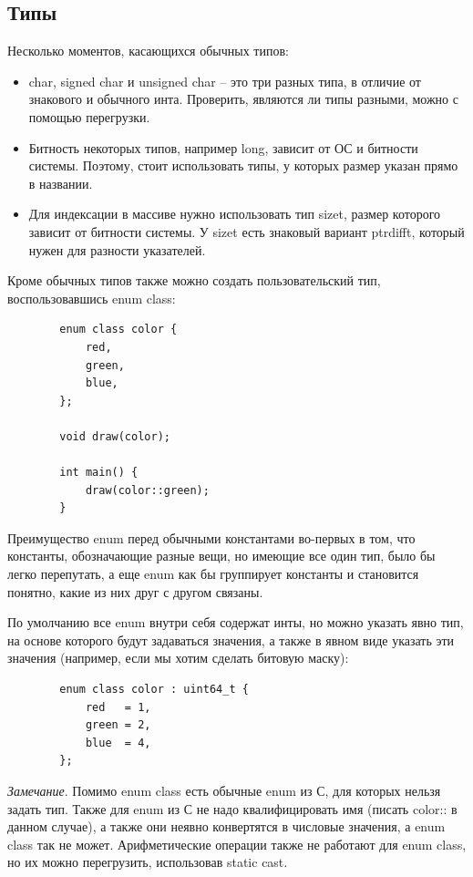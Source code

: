\documentclass[12pt, a4paper]{article}
\begin{document}
	\subsection{Типы}
	Несколько моментов, касающихся обычных типов:
	\begin{itemize}
		\item char, signed char и unsigned char -- это три разных типа, в отличие от знакового и обычного инта. Проверить, являются ли типы разными, можно с помощью перегрузки.
		\item Битность некоторых типов, например long, зависит от ОС и битности системы. Поэтому, стоит использовать типы, у которых размер указан прямо в названии.
		\item Для индексации в массиве нужно использовать тип size\textunderscore t, размер которого зависит от битности системы.
		У size\textunderscore t есть знаковый вариант ptrdiff\textunderscore t, который нужен для разности указателей.
	\end{itemize}
	\par Кроме обычных типов также можно создать пользовательский тип, воспользовавшись enum class:
	\begin{verbatim}
		enum class color {
			red,
			green,
			blue,
		};
		
		void draw(color);
		
		int main() {
			draw(color::green);
		}
	\end{verbatim}
	Преимущество enum перед обычными константами во-первых в том, что константы, обозначающие разные вещи, но имеющие все один тип, было бы легко перепутать, а еще enum как бы группирует константы и становится понятно, какие из них друг с другом связаны.
	\par По умолчанию все enum внутри себя содержат инты, но можно указать явно тип, на основе которого будут задаваться значения, а также в явном виде указать эти значения (например, если мы хотим сделать битовую маску):
	\begin{verbatim}
		enum class color : uint64_t {
			red   = 1,
			green = 2,
			blue  = 4,
		};
	\end{verbatim}
	\textit{Замечание}. Помимо enum class есть обычные enum из С, для которых нельзя задать тип. Также для enum из С не надо квалифицировать имя (писать color:: в данном случае), а также они неявно конвертятся в числовые значения, а enum class так не может. Арифметические операции также не работают для enum class, но их можно перегрузить, использовав static cast.
\end{document}
